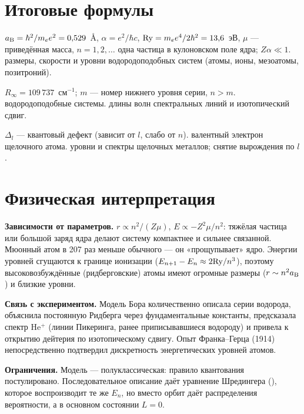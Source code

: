 \section{Итоговые формулы}

 {$a_{\mathrm B}=\hbar^2/m_e e^2=0{,}529$~Å, $\alpha=e^2/\hbar c$, $\mathrm{Ry}=m_e e^4/2\hbar^2=13{,}6$~эВ, $\mu$ — приведённая масса, $n=1,2,\dots$}
 {одна частица в кулоновском поле ядра; $Z\alpha\ll1$.}
 {размеры, скорости и уровни водородоподобных систем (атомы, ионы, мезоатомы, позитроний).}

 {$R_\infty=109\,737$~см$^{-1}$; $m$ — номер нижнего уровня серии, $n>m$.}
 {водородоподобные системы.}
 {длины волн спектральных линий и изотопический сдвиг.}

 {$\Delta_l$ — квантовый дефект (зависит от $l$, слабо от $n$).}
 {валентный электрон щелочного атома.}
 {уровни и спектры щелочных металлов; снятие вырождения по $l$.}

\section{Физическая интерпретация}

\textbf{Зависимости от параметров.} $r\propto n^2/(Z\mu)$, $E\propto -Z^2\mu/n^2$: тяжёлая частица
или большой заряд ядра делают систему компактнее и сильнее связанной. Мюонный атом в 207 раз
меньше обычного — он «прощупывает» ядро. Энергии уровней сгущаются к границе ионизации
($E_{n+1}-E_n\approx2\mathrm{Ry}/n^3$), поэтому высоковозбуждённые (ридберговские) атомы имеют огромные
размеры ($r\sim n^2a_{\mathrm B}$) и близкие уровни.

\textbf{Связь с экспериментом.} Модель Бора количественно описала серии водорода, объяснила
постоянную Ридберга через фундаментальные константы, предсказала спектр He$^+$ (линии Пикеринга,
ранее приписывавшиеся водороду) и привела к открытию дейтерия по изотопическому сдвигу. Опыт
Франка--Герца (1914) непосредственно подтвердил дискретность энергетических уровней атомов.

\textbf{Ограничения.} Модель — полуклассическая: правило квантования постулировано. Последовательное
описание даёт уравнение Шредингера (), которое воспроизводит те же $E_n$, но
вместо орбит даёт распределения вероятности, а в основном состоянии $L=0$.


